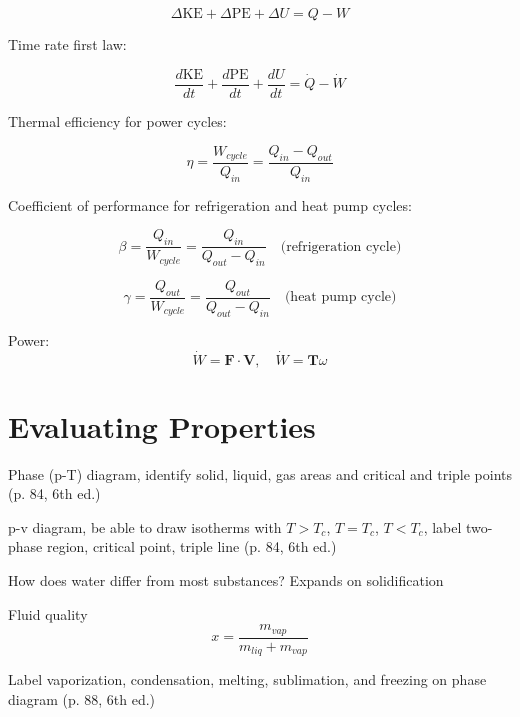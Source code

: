 \documentclass[paper=letter, fontsize=11pt]{scrartcl}
\numberwithin{equation}{section}        %
\numberwithin{figure}{section}          %
\numberwithin{table}{section}               %
\begin{document}
\begin{equation}
    \Delta \text{KE} + \Delta \text{PE} + \Delta U = Q - W
\end{equation}

Time rate first law:

\begin{equation}
    \frac{d\text{KE}}{dt} + \frac{d\text{PE}}{dt} + \frac{dU}{dt} = \dot Q - \dot W
\end{equation}

Thermal efficiency for power cycles:

\begin{equation}
\eta = \frac{W_{cycle}}{Q_{in}} = \frac{Q_{in}-Q_{out}}{Q_{in}}
\end{equation}

Coefficient of performance for refrigeration and heat pump cycles:

\begin{equation}
\beta = \frac{Q_{in}}{W_{cycle}} = \frac{Q_{in}}{Q_{out}-Q_{in}}\quad\text{(refrigeration cycle)}
\end{equation}

\begin{equation}
\gamma = \frac{Q_{out}}{W_{cycle}} = \frac{Q_{out}}{Q_{out}-Q_{in}}\quad\text{(heat pump cycle)}
\end{equation}

Power:
\begin{equation}
    \dot W = \mathbf{F}\cdot\mathbf{V},\quad\dot W = \mathbf{T}\omega
\end{equation}


\newpage
\section{Evaluating Properties}

Phase (p-T) diagram, identify solid, liquid, gas areas and critical and triple points (p. 84, 6th ed.)

p-v diagram, be able to draw isotherms with $T>T_c$, $T=T_c$, $T<T_c$, label two-phase region, critical point, triple line (p. 84, 6th ed.)

How does water differ from most substances? Expands on solidification

Fluid quality 
\begin{equation}
    x = \frac{m_{vap}}{m_{liq}+m_{vap}}
\end{equation}

Label vaporization, condensation, melting, sublimation, and freezing on phase diagram (p. 88, 6th ed.)
\end{document}
